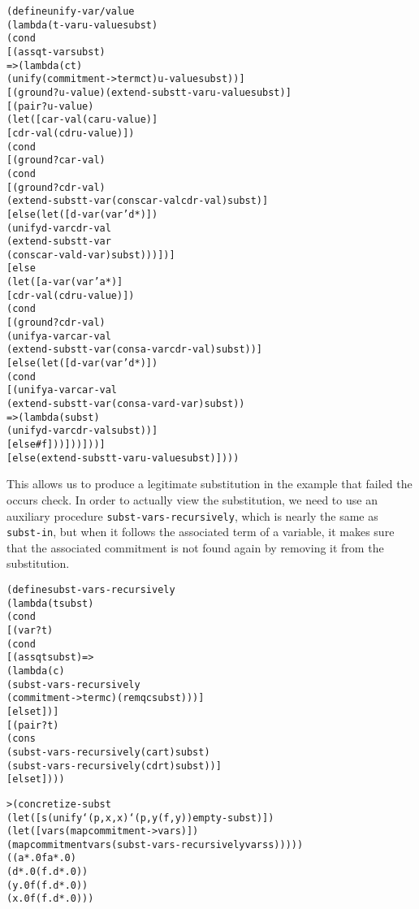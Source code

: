 \begin{alltt}
(define unify-var/value
  (lambda (t-var u-value subst)
    (cond
      [(assq t-var subst)
       => (lambda (ct)
            (unify (commitment->term ct) u-value subst))]
      [(ground? u-value) (extend-subst t-var u-value subst)]
      [(pair? u-value)
       (let ([car-val (car u-value)]
             [cdr-val (cdr u-value)])
         (cond
           [(ground? car-val)
            (cond
              [(ground? cdr-val)
               (extend-subst t-var (cons car-val cdr-val) subst)]
              [else (let ([d-var (var 'd*)])
                      (unify d-var cdr-val
                        (extend-subst t-var
                          (cons car-val d-var) subst)))])]
           [else
             (let ([a-var (var 'a*)]
                   [cdr-val (cdr u-value)])
               (cond
                 [(ground? cdr-val)
                  (unify a-var car-val
                    (extend-subst t-var (cons a-var cdr-val) subst))]
                 [else (let ([d-var (var 'd*)])
                         (cond
                           [(unify a-var car-val
                              (extend-subst t-var (cons a-var d-var) subst))
                            => (lambda (subst)
                                 (unify d-var cdr-val subst))]
                           [else #f]))]))]))]
      [else (extend-subst t-var u-value subst)])))
\end{alltt}
This allows us to produce a legitimate substitution in the example
that failed the occurs check.  In order to actually view the
substitution, we need to use an auxiliary procedure
\texttt{subst-vars-recursively}, which is nearly the same as
\texttt{subst-in}, but when it follows the associated term of a
variable, it makes sure that the associated commitment is not found
again by removing it from the substitution.

\begin{alltt}
(define subst-vars-recursively
  (lambda (t subst)
    (cond
      [(var? t)
       (cond
         [(assq t subst) =>
          (lambda (c)
            (subst-vars-recursively
              (commitment->term c) (remq c subst)))]
         [else t])]
      [(pair? t)
       (cons
         (subst-vars-recursively (car t) subst)
         (subst-vars-recursively (cdr t) subst))]
      [else t])))

> (concretize-subst
    (let ([s (unify `(p ,x ,x) `(p ,y (f ,y)) empty-subst)])
      (let ([vars (map commitment->var s)])
        (map commitment vars (subst-vars-recursively vars s)))))
((a*.0 f a*.0)
 (d*.0 (f . d*.0))
 (y.0 f (f . d*.0))
 (x.0 f (f . d*.0)))
\end{alltt}

